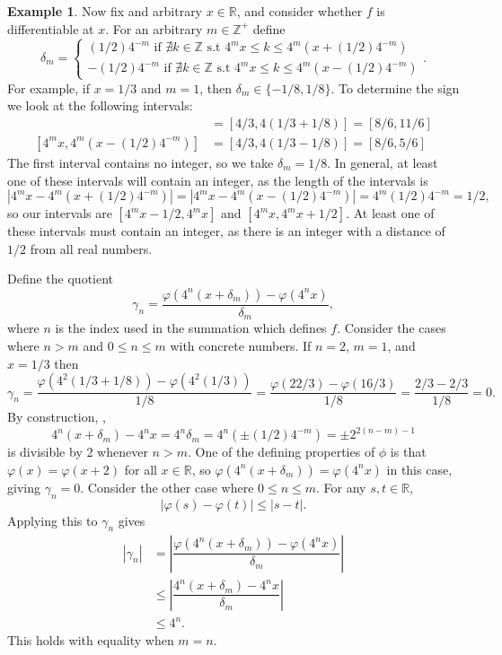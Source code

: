 \documentclass{article}
\newcommand{\R}{\mathbb{R}}
\newcommand{\Z}{\mathbb{Z}}
\theoremstyle{definition}
\newtheorem{example}{Example}[section]
\begin{document}
\begin{example}
		Now fix and arbitrary $ x\in\R $, and consider whether $ f $ is differentiable at $ x $. For an arbitrary $ m\in\Z^+ $ define $$ \delta_m = \begin{cases}
			(1/2)4^{-m}\text{ if }\nexists k\in\Z\text{ s.t } 4^mx\le k \le 4^m(x+	(1/2)4^{-m})\\-(1/2)4^{-m} \text{ if }\nexists k\in\Z\text{ s.t } 4^mx\le k \le4^m(x-	(1/2)4^{-m})
		\end{cases}. $$
		For example, if $ x = 1/3 $ and $ m = 1 $, then $ \delta_m \in\{-1/8, 1/8\}$. To determine the sign we look at the following intervals: 
		\begin{align*}
			[4^mx, 4^m(x+(1/2)4^{-m})] &= [4/3, 4(1/3+1/8)] = [8/6, 11/6]\\
			[4^mx, 4^m(x-(1/2)4^{-m})] &= [4/3, 4(1/3-1/8)] = [8/6, 5/6]
		\end{align*}
		The first interval contains no integer, so we take $ \delta_m = 1/8 $. In general, at least one of these intervals will contain an integer, as the length of the intervals is $$ |4^mx  - 4^m(x+(1/2)4^{-m}) | =  |4^mx  - 4^m(x-(1/2)4^{-m})| = 4^m(1/2)4^{-m}= 1/2,$$ so our intervals are $ [4^mx - 1/2, 4^mx ]$ and $ [4^mx, 4^mx + 1/2] $. At least one of these intervals must contain an integer, as there is an integer with a distance of $ 1/2 $ from all real numbers. 
		
		Define the quotient
		$$ \gamma_n = \dfrac{\varphi(4^n(x+\delta_m)) - \varphi(4^nx)}{\delta_m},$$ where $ n $ is the index used in the summation which defines $ f $. Consider the cases where $ n > m $ and $ 0\le n \le m $ with concrete numbers. If $ n = 2 $, $ m = 1 $, and $x = 1/3$ then $$ \gamma_n = \dfrac{\varphi(4^2(1/3+1/8)) - \varphi(4^2(1/3))}{1/8} = \dfrac{\varphi(22/3) - \varphi(16/3)}{1/8} = \dfrac{2/3 - 2/3}{1/8} = 0.$$
		By construction, ,$$ 4^n(x+\delta_m) - 4^nx = 4^n\delta_m = 4^n(\pm (1/2)4^{-m}) = \pm 2^{2(n-m)-1}  $$ is divisible by 2 whenever $ n > m $. One of the defining properties of $ \phi $ is that $ \varphi(x) = \varphi(x+2)  $ for all $ x\in\R $, so $ \varphi(4^n(x+\delta_m))  = \varphi(4^nx)  $ in this case, giving $ \gamma_n = 0 $. Consider the other case where $  0 \le n \le m $. For any $ s,t\in\R $, $$ |\varphi(s) - \varphi(t)| \le |s - t|.$$ Applying this to $ \gamma_n $ gives 
		\begin{align*}
			|\gamma_n| &= \left\lvert\dfrac{\varphi(4^n(x+\delta_m)) - \varphi(4^nx)}{\delta_m}\right\rvert\\&\le 
			\left\lvert\dfrac{4^n(x+\delta_m) - 4^nx}{\delta_m}\right\rvert\\& \le 4^n.
		\end{align*}
		This holds with equality when $ m = n $. 
		

\end{example}
\end{document}
